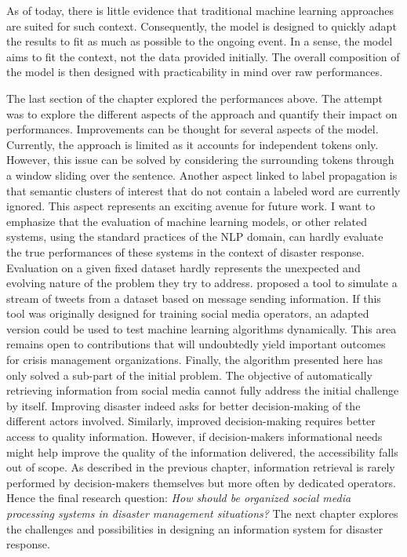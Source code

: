 As of today, there is little evidence that traditional machine learning approaches are suited for such context.
Consequently, the model is designed to quickly adapt the results to fit as much as possible to the ongoing event.
In a sense, the model aims to fit the context, not the data provided initially.
The overall composition of the model is then designed with practicability in mind over raw performances.

The last section of the chapter explored the performances above.
The attempt was to explore the different aspects of the approach and quantify their impact on performances.
Improvements can be thought for several aspects of the model.
Currently, the approach is limited as it accounts for independent tokens only.
However, this issue can be solved by considering the surrounding tokens through a window sliding over the sentence.
Another aspect linked to label propagation is that semantic clusters of interest that do not contain a labeled word are currently ignored.
This aspect represents an exciting avenue for future work.
I want to emphasize that the evaluation of machine learning models, or other related systems, using the standard practices of the NLP domain, can hardly evaluate the true performances of these systems in the context of disaster response.
Evaluation on a given fixed dataset hardly represents the unexpected and evolving nature of the problem they try to address.
\textcite{halseSimulatingRealtimeTwitter2019} proposed a tool to simulate a stream of tweets from a dataset based on message sending information.
If this tool was originally designed for training social media operators, an adapted version could be used to test machine learning algorithms dynamically.
This area remains open to contributions that will undoubtedly yield important outcomes for crisis management organizations.
Finally, the algorithm presented here has only solved a sub-part of the initial problem.
The objective of automatically retrieving information from social media cannot fully address the initial challenge by itself.
Improving disaster indeed asks for better decision-making of the different actors involved.
Similarly, improved decision-making requires better access to quality information.
However, if decision-makers informational needs might help improve the quality of the information delivered, the accessibility falls out of scope.
As described in the previous chapter, information retrieval is rarely performed by decision-makers themselves but more often by dedicated operators.
Hence the final research question: \textit{How should be organized social media processing systems in disaster management situations?}
The next chapter explores the challenges and possibilities in designing an information system for disaster response.

